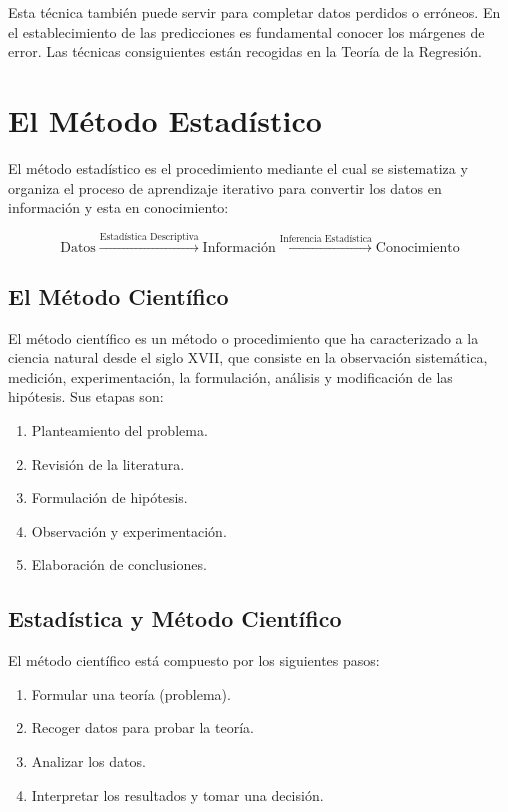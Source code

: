 Esta técnica también puede servir para completar datos perdidos o erróneos. En el establecimiento de las predicciones es fundamental conocer los márgenes de error. Las técnicas consiguientes están recogidas en la Teoría de la Regresión.

\section{El Método Estadístico}

El método estadístico es el procedimiento mediante el cual se sistematiza y organiza el proceso de aprendizaje iterativo para convertir los datos en información y esta en conocimiento:

$$\text{Datos} \xrightarrow{\text{Estadística Descriptiva}} \text{Información} \xrightarrow{\text{Inferencia Estadística}} \text{Conocimiento}$$

\subsection{El Método Científico}
El método científico es un método o procedimiento que ha caracterizado a la ciencia natural desde el siglo XVII, que consiste en la observación sistemática, medición, experimentación, la formulación, análisis y modificación de las hipótesis. Sus etapas son:

\begin{enumerate}
    \item Planteamiento del problema.
    \item Revisión de la literatura.
    \item Formulación de hipótesis.
    \item Observación y experimentación.
    \item Elaboración de conclusiones.
\end{enumerate}

\subsection{Estadística y Método Científico}
El método científico está compuesto por los siguientes pasos:
\begin{enumerate}
    \item Formular una teoría (problema).
    \item Recoger datos para probar la teoría.
    \item Analizar los datos.
    \item Interpretar los resultados y tomar una decisión.
\end{enumerate}

